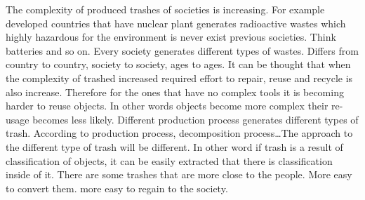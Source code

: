 



 

The complexity of produced trashes of societies is increasing. For example developed countries that have nuclear plant generates radioactive wastes which highly hazardous for the environment is never exist previous societies. Think batteries and so on. Every society generates different types of wastes. Differs from country to country, society to society, ages to ages. It can be thought that when the complexity of trashed increased required effort to repair, reuse and recycle is also increase. Therefore for the ones that have no complex tools it is becoming harder to reuse objects. In other words objects become more complex their re-usage becomes less likely.  Different production process generates different types of trash. According to production process, decomposition process\ldots The approach to the different type of trash will be different. In other word if trash is a result of classification of objects, it can be easily extracted that there is classification inside of it. There are some trashes that are more close to the people. More easy to convert them. more easy to regain to the society. 


 


